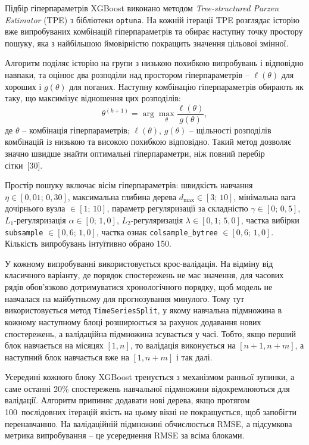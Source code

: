 \documentclass{bachelor_thesis}
\begin{document}
Підбір гіперпараметрів XGBoost виконано методом \textit{Tree-structured Parzen Estimator} (TPE) з бібліотеки \texttt{optuna}. На кожній ітерації TPE розглядає історію вже випробуваних комбінацій гіперпараметрів та обирає наступну точку простору пошуку, яка з найбільшою ймовірністю покращить значення цільової змінної.

Алгоритм поділяє історію на групи з низькою похибкою випробувань і відповідно навпаки, та оцінює два розподіли над простором гіперпараметрів -- $\ell(\theta)$ для хороших і $g(\theta)$ для поганих. Наступну комбінацію гіперпараметрів обирають як таку, що максимізує відношення цих розподілів:
\begin{equation*}
\theta^{(k+1)} = \arg\max_{\theta} \frac{\ell(\theta)}{g(\theta)},
\end{equation*}
\noindent де $\theta$ -- комбінація гіперпараметрів; $\ell(\theta)$, $g(\theta)$ -- щільності розподілів комбінацій із низькою та високою похибкою відповідно. Такий метод дозволяє значно швидше знайти оптимальні гіперпараметри, ніж повний перебір сітки~[30].

Простір пошуку включає вісім гіперпараметрів: швидкість навчання $\eta \in [0{,}01;\,0{,}30]$, максимальна глибина дерева $d_{\max} \in [3;\,10]$, мінімальна вага дочірнього вузла $\in [1;\,10]$, параметр регуляризації за складністю $\gamma \in [0;\,0{,}5]$, $L_1$-регуляризація $\alpha \in [0;\,1{,}0]$, $L_2$-регуляризація $\lambda \in [0{,}1;\,5{,}0]$, частка вибірки \texttt{subsample} $\in [0{,}6;\,1{,}0]$, частка ознак \texttt{colsample\_bytree} $\in [0{,}6;\,1{,}0]$. Кількість випробувань інтуїтивно обрано 150.

У кожному випробуванні використовується крос-валідація. На відміну від класичного варіанту, де порядок спостережень не має значення, для часових рядів обов'язково дотримуватися хронологічного порядку, щоб модель не навчалася на майбутньому для прогнозування минулого. Тому тут використовується метод \texttt{TimeSeriesSplit}, у якому навчальна підмножина в кожному наступному блоці розширюється за рахунок додавання нових спостережень, а валідаційна підмножина зсувається у часі. Тобто, якщо перший блок навчається на місяцях $[1, n]$, то валідація виконується на $[n+1, n+m]$, а наступний блок навчається вже на $[1, n+m]$ і так далі.

Усередині кожного блоку XGBoost тренується з механізмом ранньої зупинки, а саме останні 20\% спостережень навчальної підмножини відокремлюються для валідації. Алгоритм припиняє додавати нові дерева, якщо протягом 100~послідовних ітерацій якість на цьому вікні не покращується, щоб запобігти перенавчанню. На валідаційній підмножині обчислюється RMSE, а підсумкова метрика випробування -- це усереднення RMSE за всіма блоками.
\end{document}
